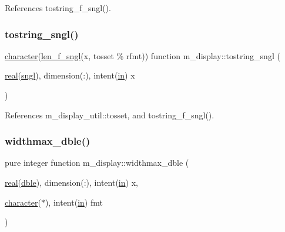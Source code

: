 References tostring\+\_\+f\+\_\+sngl().

\mbox{\label{namespacem__display_a369e3db088c0732554bd00dac6ce628d}} 
\subsubsection{\texorpdfstring{tostring\+\_\+sngl()}{tostring\_sngl()}}
{\footnotesize\ttfamily \hyperlink{option__stopwatch_83_8txt_abd4b21fbbd175834027b5224bfe97e66}{character}(\hyperlink{namespacem__display_ae0feb946fbc4c31f8ba53e20719fa508}{len\+\_\+f\+\_\+sngl}(x, tosset \% rfmt)) function m\+\_\+display\+::tostring\+\_\+sngl (\begin{DoxyParamCaption}\item[{\hyperlink{read__watch_83_8txt_abdb62bde002f38ef75f810d3a905a823}{real}(\hyperlink{namespacem__display_a2ac86bc535c3ccc5947dbb3109c666b5}{sngl}), dimension(\+:), intent(\hyperlink{M__journal_83_8txt_afce72651d1eed785a2132bee863b2f38}{in})}]{x }\end{DoxyParamCaption})\hspace{0.3cm}{\ttfamily [private]}}



References m\+\_\+display\+\_\+util\+::tosset, and tostring\+\_\+f\+\_\+sngl().

\mbox{\label{namespacem__display_aed07125464a462f9fa53ed2333846273}} 
\subsubsection{\texorpdfstring{widthmax\+\_\+dble()}{widthmax\_dble()}}
{\footnotesize\ttfamily pure integer function m\+\_\+display\+::widthmax\+\_\+dble (\begin{DoxyParamCaption}\item[{\hyperlink{read__watch_83_8txt_abdb62bde002f38ef75f810d3a905a823}{real}(\hyperlink{namespacem__display_a46d90b75b6ccef7ccade133e5847e815}{dble}), dimension(\+:), intent(\hyperlink{M__journal_83_8txt_afce72651d1eed785a2132bee863b2f38}{in})}]{x,  }\item[{\hyperlink{option__stopwatch_83_8txt_abd4b21fbbd175834027b5224bfe97e66}{character}($\ast$), intent(\hyperlink{M__journal_83_8txt_afce72651d1eed785a2132bee863b2f38}{in})}]{fmt }\end{DoxyParamCaption})\hspace{0.3cm}{\ttfamily [private]}}



